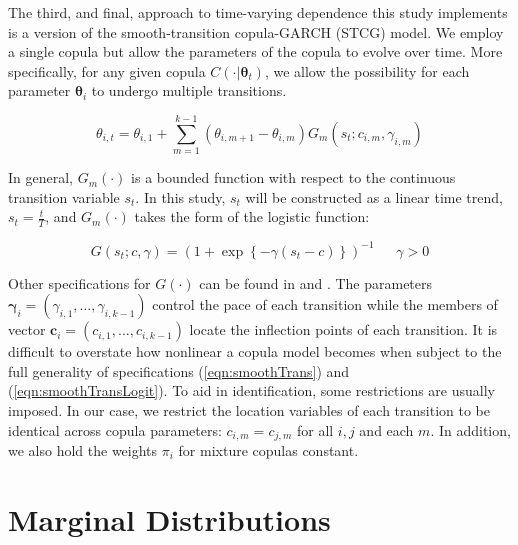 The third, and final, approach to time-varying dependence this study implements is a version of the smooth-transition copula-GARCH (STCG) model. We employ a single copula but allow the parameters of the copula to evolve over time. More specifically, for any given copula $C\left(\cdot | \mathbf{\theta}_{t}\right)$, we allow the possibility for each parameter $\boldsymbol{\theta}_{i}$ to undergo multiple transitions.

\begin{equation} \label{eqn:smoothTrans}
	\theta_{i,t} = \theta_{i,1} + \sum_{m=1}^{k-1}\left(\theta_{i,m+1} - \theta_{i,m}\right) G_{m}\left(s_{t}; c_{i,m},\gamma_{i,m}\right)
\end{equation}

In general, $G_{m}\left(\cdot\right)$ is a bounded function with respect to the continuous transition variable $s_{t}$. In this study, $s_{t}$ will be constructed as a linear time trend, $s_{t}=\frac{t}{T}$, and $G_{m}\left(\cdot\right)$ takes the form of the logistic function:

\begin{equation} \label{eqn:smoothTransLogit}
	G\left(s_{t}; c, \gamma\right) = \left(1+\exp\left\{ -\gamma \left(s_{t}-c\right) \right\}\right)^{-1}~~~~~~~\gamma > 0
\end{equation}

Other specifications for $G\left( \cdot \right) $ can be found in \cite{Dijk_and_Frances_1999} and \cite{Ocal_and_Osborn_2000}. The parameters $\boldsymbol{\gamma}_{i} = \left(\gamma_{i,1},...,\gamma_{i,k-1}\right)$ control the pace of each transition while the members of vector $\mathbf{c}_{i} = \left(c_{i,1},...,c_{i,k-1}\right)$ locate the inflection points of each transition. It is difficult to overstate how nonlinear a copula model becomes when subject to the full generality of specifications (\ref{eqn:smoothTrans}) and (\ref{eqn:smoothTransLogit}). To aid in identification, some restrictions are usually imposed. In our case, we restrict the location variables of each transition to be identical across copula parameters: $c_{i,m}=c_{j,m}$ for all $i,j$ and each $m$. In addition, we also hold the weights $\pi_{i}$ for mixture copulas constant.

\section{Marginal Distributions} \label{sec:marginal_distributions}


